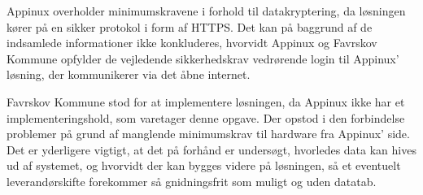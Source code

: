 Appinux overholder minimumskravene i forhold til datakryptering, da løsningen kører på en sikker protokol i form af HTTPS. Det kan på baggrund af de indsamlede informationer ikke konkluderes, hvorvidt Appinux og Favrskov Kommune opfylder de vejledende sikkerhedskrav vedrørende login til Appinux' løsning, der kommunikerer via det åbne internet. 

Favrskov Kommune stod for at implementere løsningen, da Appinux ikke har et implementeringshold, som varetager denne opgave. Der opstod i den forbindelse problemer på grund af manglende minimumskrav til hardware fra Appinux' side. Det er yderligere vigtigt, at det på forhånd er undersøgt, hvorledes data kan hives ud af systemet, og hvorvidt der kan bygges videre på løsningen, så et eventuelt leverandørskifte forekommer så gnidningsfrit som muligt og uden datatab.
